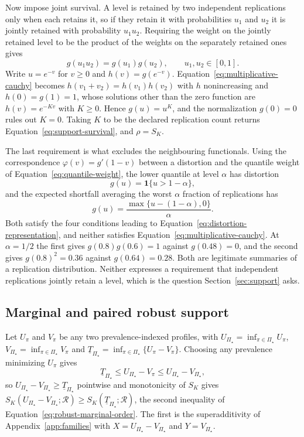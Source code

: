 \documentclass[11pt]{article}
\newcommand{\Regime}{\mathcal{R}}
\newcommand{\PSet}{\Pi_\star}
\theoremstyle{remark}
\begin{document}
Now impose joint survival. A level is retained by two independent replications only when each retains it, so if they retain it with probabilities $u_1$ and $u_2$ it is jointly retained with probability $u_1u_2$. Requiring the weight on the jointly retained level to be the product of the weights on the separately retained ones gives
\begin{equation}
g(u_1u_2)=g(u_1)g(u_2),
\qquad
u_1,u_2\in[0,1].
\label{eq:multiplicative-cauchy}
\end{equation}
Write $u=e^{-v}$ for $v\geq0$ and $h(v)=g(e^{-v})$. Equation~\eqref{eq:multiplicative-cauchy} becomes $h(v_1+v_2)=h(v_1)h(v_2)$ with $h$ nonincreasing and $h(0)=g(1)=1$, whose solutions other than the zero function are $h(v)=e^{-Kv}$ with $K\geq0$. Hence $g(u)=u^{K}$, and the normalization $g(0)=0$ rules out $K=0$. Taking $K$ to be the declared replication count returns Equation~\eqref{eq:support-survival}, and $\rho=S_K$.

The last requirement is what excludes the neighbouring functionals. Using the correspondence $\varphi(v)=g'(1-v)$ between a distortion and the quantile weight of Equation~\eqref{eq:quantile-weight}, the lower quantile at level $\alpha$ has distortion
\[
g(u)=\mathbf{1}\{u>1-\alpha\},
\]
and the expected shortfall averaging the worst $\alpha$ fraction of replications has
\[
g(u)=\frac{\max\{u-(1-\alpha),0\}}{\alpha}.
\]
Both satisfy the four conditions leading to Equation~\eqref{eq:distortion-representation}, and neither satisfies Equation~\eqref{eq:multiplicative-cauchy}. At $\alpha=1/2$ the first gives $g(0.8)g(0.6)=1$ against $g(0.48)=0$, and the second gives $g(0.8)^2=0.36$ against $g(0.64)=0.28$. Both are legitimate summaries of a replication distribution. Neither expresses a requirement that independent replications jointly retain a level, which is the question Section~\ref{sec:support} asks.

\subsection{Marginal and paired robust support}

Let $U_\pi$ and $V_\pi$ be any two prevalence-indexed profiles, with $U_{\PSet}=\inf_{\pi\in\PSet}U_\pi$, $V_{\PSet}=\inf_{\pi\in\PSet}V_\pi$ and $\underline{T}_{\PSet}=\inf_{\pi\in\PSet}\{U_\pi-V_\pi\}$. Choosing any prevalence minimizing $U_\pi$ gives
\[
\underline{T}_{\PSet}
\leq
U_{\PSet}-V_\pi
\leq
U_{\PSet}-V_{\PSet},
\]
so $U_{\PSet}-V_{\PSet}\geq\underline{T}_{\PSet}$ pointwise and monotonicity of $S_K$ gives $S_K(U_{\PSet}-V_{\PSet};\Regime)\geq S_K(\underline{T}_{\PSet};\Regime)$, the second inequality of Equation~\eqref{eq:robust-marginal-order}. The first is the superadditivity of Appendix~\ref{app:families} with $X=U_{\PSet}-V_{\PSet}$ and $Y=V_{\PSet}$.
\end{document}
